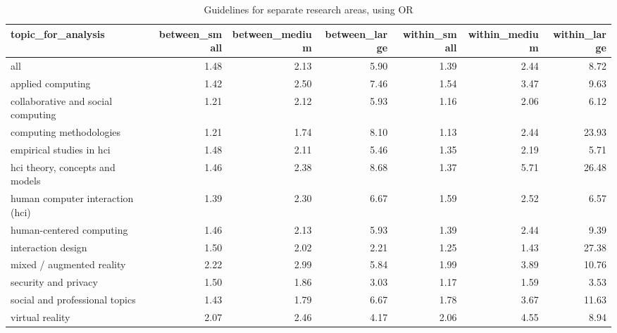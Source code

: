 \begin{table}[ht]
\centering
\begin{tabular}{lrrrrrr}
  \hline
topic\_for\_analysis & between\_small & between\_medium & between\_large & within\_small & within\_medium & within\_large \\ 
  \hline
all & 1.48 & 2.13 & 5.90 & 1.39 & 2.44 & 8.72 \\ 
  applied computing & 1.42 & 2.50 & 7.46 & 1.54 & 3.47 & 9.63 \\ 
  collaborative and social computing & 1.21 & 2.12 & 5.93 & 1.16 & 2.06 & 6.12 \\ 
  computing methodologies & 1.21 & 1.74 & 8.10 & 1.13 & 2.44 & 23.93 \\ 
  empirical studies in hci & 1.48 & 2.11 & 5.46 & 1.35 & 2.19 & 5.71 \\ 
  hci theory, concepts and models & 1.46 & 2.38 & 8.68 & 1.37 & 5.71 & 26.48 \\ 
  human computer interaction (hci) & 1.39 & 2.30 & 6.67 & 1.59 & 2.52 & 6.57 \\ 
  human-centered computing & 1.46 & 2.13 & 5.93 & 1.39 & 2.44 & 9.39 \\ 
  interaction design & 1.50 & 2.02 & 2.21 & 1.25 & 1.43 & 27.38 \\ 
  mixed / augmented reality & 2.22 & 2.99 & 5.84 & 1.99 & 3.89 & 10.76 \\ 
  security and privacy & 1.50 & 1.86 & 3.03 & 1.17 & 1.59 & 3.53 \\ 
  social and professional topics & 1.43 & 1.79 & 6.67 & 1.78 & 3.67 & 11.63 \\ 
  virtual reality & 2.07 & 2.46 & 4.17 & 2.06 & 4.55 & 8.94 \\ 
   \hline
\end{tabular}
\caption{Guidelines for separate research areas, using \ac{OR}} 
\label{tab:es guidelines or-es different topics}
\end{table}

